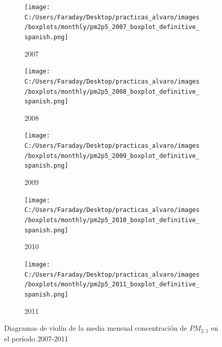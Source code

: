 \documentclass[12pt]{article}
\begin{document}
\begin{figure}[H]
\centering
\begin{subfigure}[H]{0.45\textwidth}
\texttt{[image: C:/Users/Faraday/Desktop/practicas\_alvaro/images/boxplots/monthly/pm2p5\_2007\_boxplot\_definitive\_spanish.png]}
\captionsetup{labelformat=empty}
\caption{2007}
\label{fig:box-pm2p5-2007}
\end{subfigure}
%
\begin{subfigure}[H]{0.45\textwidth}
\texttt{[image: C:/Users/Faraday/Desktop/practicas\_alvaro/images/boxplots/monthly/pm2p5\_2008\_boxplot\_definitive\_spanish.png]}
\captionsetup{labelformat=empty}
\caption{2008}
\label{fig:box-pm2p5-2008}
\end{subfigure}

\begin{subfigure}[H]{0.45\textwidth}
\texttt{[image: C:/Users/Faraday/Desktop/practicas\_alvaro/images/boxplots/monthly/pm2p5\_2009\_boxplot\_definitive\_spanish.png]}
\captionsetup{labelformat=empty}
\caption{2009}
\label{fig:box-pm2p5-2009}
\end{subfigure}
%
\begin{subfigure}[H]{0.45\textwidth}
\texttt{[image: C:/Users/Faraday/Desktop/practicas\_alvaro/images/boxplots/monthly/pm2p5\_2010\_boxplot\_definitive\_spanish.png]}
\captionsetup{labelformat=empty}
\caption{2010}
\label{fig:box-pm2p5-2010}
\end{subfigure}

\begin{subfigure}[H]{0.45\textwidth}
\texttt{[image: C:/Users/Faraday/Desktop/practicas\_alvaro/images/boxplots/monthly/pm2p5\_2011\_boxplot\_definitive\_spanish.png]}
\captionsetup{labelformat=empty}
\caption{2011}
\label{fig:box-pm2p5-2011}
\end{subfigure}
\caption{Diagramas de violín de la media mensual concentración de $PM_{2,5}$ en el período 2007-2011}
\label{fig:box-pm2p5-monthly}
\end{figure}
\end{document}
